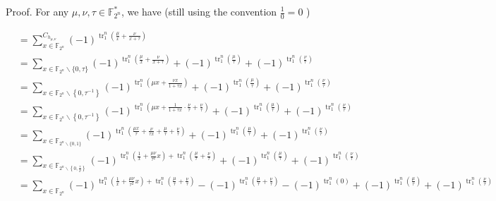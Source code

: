\documentclass[10pt]{article}
\begin{document}
Proof. For any $\mu, \nu, \tau \in \mathbb{F}_{2^{n}}^{*}$, we have (still using the convention $\frac{1}{0}=0$ )

$$
\begin{aligned}
& =\sum_{x \in \mathbb{F}_{2^{n}}}^{C_{h_{\mu, \nu}}}(-1)^{\operatorname{tr}_{1}^{n}\left(\frac{\mu}{x}+\frac{\nu}{x+\tau}\right)} \\
& =\sum_{x \in \mathbb{F}_{2^{n}} \backslash\{0, \tau\}}(-1)^{\operatorname{tr}_{1}^{n}\left(\frac{\mu}{x}+\frac{\nu}{x+\tau}\right)}+(-1)^{\operatorname{tr}_{1}^{n}\left(\frac{\mu}{\tau}\right)}+(-1)^{\operatorname{tr}_{1}^{n}\left(\frac{\nu}{\tau}\right)} \\
& =\sum_{x \in \mathbb{F}_{2^{n}} \backslash\left\{0, \tau^{-1}\right\}}(-1)^{\operatorname{tr}_{1}^{n}\left(\mu x+\frac{\nu x}{1+\tau x}\right)}+(-1)^{\operatorname{tr}_{1}^{n}\left(\frac{\mu}{\tau}\right)}+(-1)^{\operatorname{tr}_{1}^{n}\left(\frac{\nu}{\tau}\right)} \\
& =\sum_{x \in \mathbb{F}_{2^{n}} \backslash\left\{0, \tau^{-1}\right\}}(-1)^{\operatorname{tr}_{1}^{n}\left(\mu x+\frac{1}{1+\tau x} \cdot \frac{\nu}{\tau}+\frac{\nu}{\tau}\right)}+(-1)^{\operatorname{tr}_{1}^{n}\left(\frac{\mu}{\tau}\right)}+(-1)^{\operatorname{tr}_{1}^{n}\left(\frac{\nu}{\tau}\right)} \\
& =\sum_{x \in \mathbb{F}_{2^{n} \backslash\{0,1\}}}(-1)^{\operatorname{tr}_{1}^{n}\left(\frac{\mu x}{\tau}+\frac{\nu}{\tau x}+\frac{\mu}{\tau}+\frac{\nu}{\tau}\right)}+(-1)^{\operatorname{tr}_{1}^{n}\left(\frac{\mu}{\tau}\right)}+(-1)^{\operatorname{tr}_{1}^{n}\left(\frac{\nu}{\tau}\right)} \\
& =\sum_{x \in \mathbb{F}_{2^{n} \backslash\left\{0, \frac{\tau}{\nu}\right\}}}(-1)^{\operatorname{tr}_{1}^{n}\left(\frac{1}{x}+\frac{\mu \nu}{\tau^{2}} x\right)+\operatorname{tr}_{1}^{n}\left(\frac{\mu}{\tau}+\frac{\nu}{\tau}\right)}+(-1)^{\operatorname{tr}_{1}^{n}\left(\frac{\mu}{\tau}\right)}+(-1)^{\operatorname{tr}_{1}^{n}\left(\frac{\nu}{\tau}\right)} \\
& =\sum_{x \in \mathbb{F}_{2^{n}}}(-1)^{\operatorname{tr}_{1}^{n}\left(\frac{1}{x}+\frac{\mu \nu}{\tau^{2}} x\right)+\operatorname{tr}_{1}^{n}\left(\frac{\mu}{\tau}+\frac{\nu}{\tau}\right)}-(-1)^{\operatorname{tr}_{1}^{n}\left(\frac{\mu}{\tau}+\frac{\nu}{\tau}\right)}-(-1)^{\operatorname{tr}_{1}^{n}(0)}+(-1)^{\operatorname{tr}_{1}^{n}\left(\frac{\mu}{\tau}\right)}+(-1)^{\operatorname{tr}_{1}^{n}\left(\frac{\nu}{\tau}\right)}
\end{aligned}
$$
\end{document}
